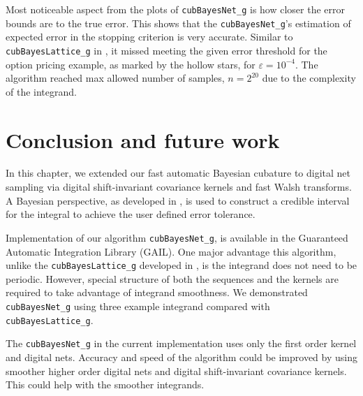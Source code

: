 \documentclass[graybox,footinfo]{svmult}
\begin{document}
Most noticeable aspect from the plots of \texttt{cubBayesNet\_g} is how closer the error bounds are to the true error. 
This shows that the \texttt{cubBayesNet\_g}'s estimation of expected error in the stopping criterion is very accurate. 
Similar to \texttt{cubBayesLattice\_g} in \cite{RatHic19a}, it missed meeting the given error threshold for the option pricing example, as marked by the hollow stars, for $\varepsilon=10^{-4}$. The algorithm reached max allowed number of samples, $n=2^{20}$ due to the complexity of the integrand.





\section{Conclusion and future work}
\label{FJ:sec:conclusion-future-work}

In this chapter, we extended our fast automatic Bayesian cubature to digital net sampling via digital shift-invariant covariance kernels and fast Walsh transforms. A Bayesian perspective, as developed in \cite{RatHic19a}, is used to construct a credible interval for the integral to achieve the user defined error tolerance. 

Implementation of our algorithm \texttt{cubBayesNet\_g}, is available in the Guaranteed Automatic Integration Library (GAIL).  One major advantage this algorithm, unlike the \texttt{cubBayesLattice\_g} developed in \cite{RatHic19a}, is the integrand does not need to be periodic.
However, special structure of both the sequences and the kernels are required to take advantage of integrand smoothness.
We demonstrated \texttt{cubBayesNet\_g} using three example integrand compared with \texttt{cubBayesLattice\_g}. 

The \texttt{cubBayesNet\_g} in the current implementation uses only the first order kernel and digital nets. Accuracy and speed of the algorithm could be improved by using smoother higher order digital nets and digital shift-invariant covariance kernels. This could help with the smoother integrands. 



% 


\end{document}
